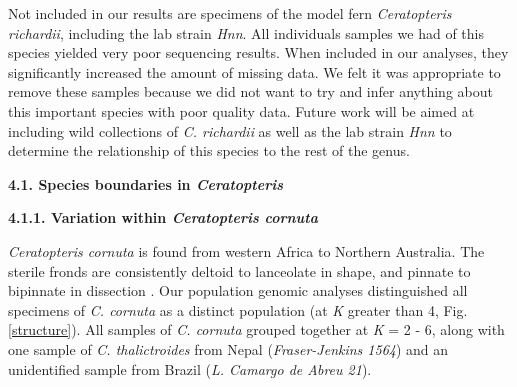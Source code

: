 \documentclass[12pt]{article}
\begin{document}
\begin{flushleft}
Not included in our results are specimens of the model fern \textit{Ceratopteris richardii}, including the lab strain \textit{Hnn}. All individuals samples we had of this species yielded very poor sequencing results. When included in our analyses, they significantly increased the amount of missing data. We felt it was appropriate to remove these samples because we did not want to try and infer anything about this important species with poor quality data. Future work will be aimed at including wild collections of \textit{C. richardii} as well as the lab strain \textit{Hnn} to determine the relationship of this species to the rest of the genus.

\textbf{4.1. Species boundaries in \textit{Ceratopteris}} 

\textbf{4.1.1. Variation within \textit{Ceratopteris cornuta}}

\textit{Ceratopteris cornuta} is found from western Africa to Northern Australia. The sterile fronds are consistently deltoid to lanceolate in shape, and pinnate to bipinnate in dissection \autocite{LloydTax1974}. Our population genomic analyses distinguished all specimens of \textit{C. cornuta} as a distinct population (at \textit{K} greater than 4, Fig. \ref{structure}). All samples of \textit{C. cornuta} grouped together at \textit{K} = 2 - 6, along with one sample of \textit{C. thalictroides} from Nepal (\textit{Fraser-Jenkins 1564}) and an unidentified sample from Brazil (\textit{L. Camargo de Abreu 21}). 


\end{flushleft}
\end{document}
